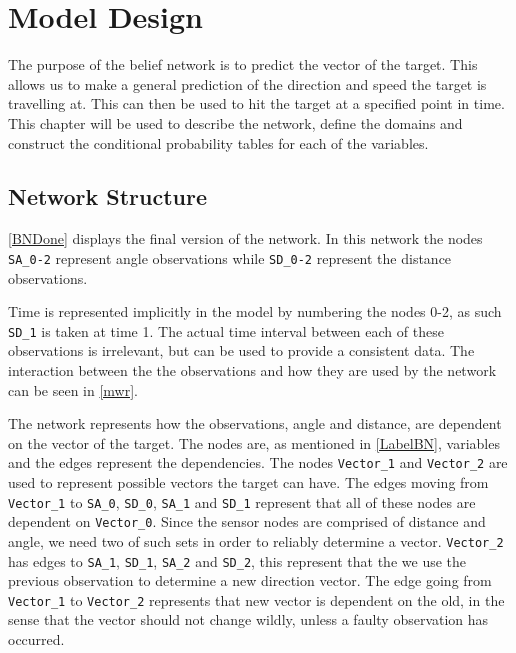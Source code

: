 \chapter{Model Design}\label{BNModel}

The purpose of the belief network is to predict the vector of the
target. This allows us to make a general prediction of the direction and speed
the target is travelling at. This can then be used to hit the target at a
specified point in time. This chapter will be used to describe the network,
define the domains and construct the conditional probability tables for each of
the variables.

\section{Network Structure}
\autoref{BNDone} displays the final version of the network. In this network the
nodes \texttt{SA\_0-2} represent angle observations while \texttt{SD\_0-2}
represent the distance observations.


Time is represented implicitly in the model by numbering the nodes 0-2, as such
\texttt{SD\_1} is taken at time 1. The actual time interval between each of
these observations is irrelevant, but can be used to provide a consistent data.
The interaction between the the observations and how they are used by the
network can be seen in \autoref{mwr}.


The network represents how the observations, angle and distance, are dependent
on the vector of the target. The nodes are, as mentioned in \autoref{LabelBN},
variables and the edges represent the dependencies. The nodes
\texttt{Vector\_1} and \texttt{Vector\_2} are used to represent possible
vectors the target can have. The edges moving from \texttt{Vector\_1} to
\texttt{SA\_0}, \texttt{SD\_0}, \texttt{SA\_1} and \texttt{SD\_1} represent
that all of these nodes are dependent on \texttt{Vector\_0}. Since the sensor
nodes are comprised of distance and angle, we need two of such sets in order to
reliably determine a vector. \texttt{Vector\_2} has edges to \texttt{SA\_1},
\texttt{SD\_1}, \texttt{SA\_2} and \texttt{SD\_2}, this represent that the we
use the previous observation to determine a new direction vector. The edge
going from \texttt{Vector\_1} to \texttt{Vector\_2} represents that new vector
is dependent on the old, in the sense that the vector should not change wildly,
unless a faulty observation has occurred.

